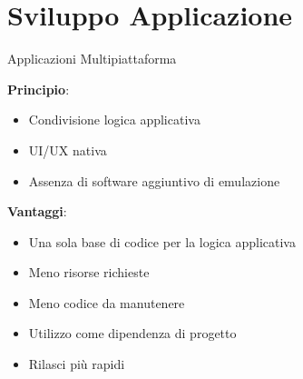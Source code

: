 
\section{Sviluppo Applicazione}

\begin{frame}{Applicazioni Multipiattaforma}

    \textbf{Principio}:
    \begin{itemize}
        \item Condivisione logica applicativa
        \item UI/UX nativa
        \item Assenza di software aggiuntivo di emulazione
    \end{itemize}

    \vspace{3mm}

    \textbf{Vantaggi}:
    \begin{itemize}
        \item Una sola base di codice per la logica applicativa
        \item Meno risorse richieste
        \item Meno codice da manutenere
        \item Utilizzo come dipendenza di progetto
        \item Rilasci più rapidi
    \end{itemize}
    
\end{frame}

